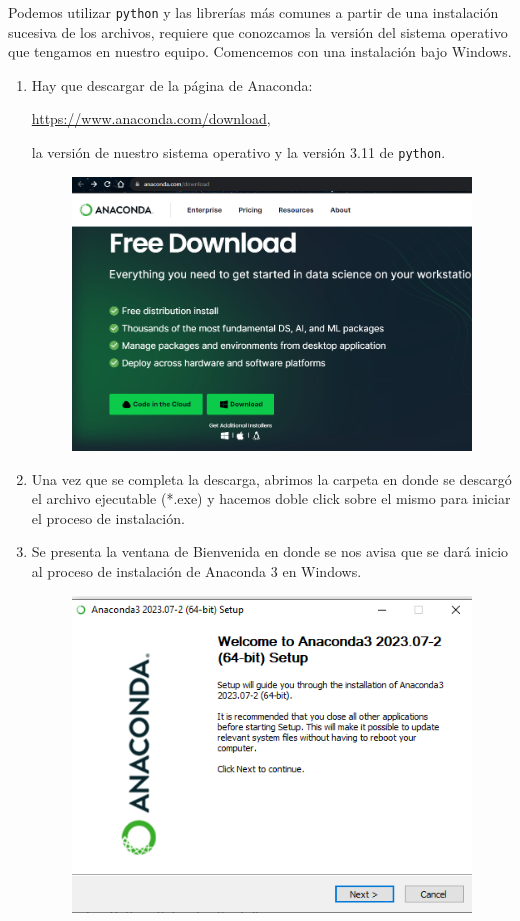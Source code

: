 \documentclass[12pt]{article}
\begin{document}
Podemos utilizar \texttt{python} y las librerías más comunes a partir de una instalación sucesiva de los archivos, requiere que conozcamos la versión del sistema operativo que tengamos en nuestro equipo. Comencemos con una instalación bajo Windows.
\begin{enumerate}
\item Hay que descargar de la página de Anaconda:

\url{https://www.anaconda.com/download},

la versión de nuestro sistema operativo y la versión 3.11 de \texttt{python}.
\begin{figure}[H]
	\centering
	\includegraphics[scale=0.5]{Imagenes/Nueva_Instalacion_Windows_01.png} 
\end{figure}
\item Una vez que se completa la descarga, abrimos la carpeta en donde se descargó el archivo ejecutable (*.exe) y hacemos doble click sobre el mismo para iniciar el proceso de instalación.
\item Se presenta la ventana de Bienvenida en donde se nos avisa que se dará inicio al proceso de instalación de Anaconda 3 en  Windows.
\begin{figure}[H]
	\centering
	\includegraphics[scale=0.5]{Imagenes/Nueva_Instalacion_Windows_02.png} 

\end{figure}
\end{enumerate}
\end{document}
